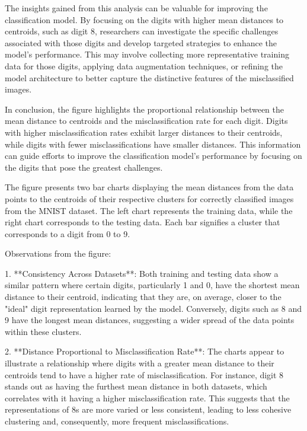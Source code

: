The insights gained from this analysis can be valuable for improving the classification model. By focusing on the digits with higher mean distances to centroids, such as digit 8, researchers can investigate the specific challenges associated with those digits and develop targeted strategies to enhance the model's performance. This may involve collecting more representative training data for those digits, applying data augmentation techniques, or refining the model architecture to better capture the distinctive features of the misclassified images.

In conclusion, the figure highlights the proportional relationship between the mean distance to centroids and the misclassification rate for each digit. Digits with higher misclassification rates exhibit larger distances to their centroids, while digits with fewer misclassifications have smaller distances. This information can guide efforts to improve the classification model's performance by focusing on the digits that pose the greatest challenges.


The figure presents two bar charts displaying the mean distances from the data points to the centroids of their respective clusters for correctly classified images from the MNIST dataset. The left chart represents the training data, while the right chart corresponds to the testing data. Each bar signifies a cluster that corresponds to a digit from 0 to 9.

Observations from the figure:

1. **Consistency Across Datasets**: Both training and testing data show a similar pattern where certain digits, particularly 1 and 0, have the shortest mean distance to their centroid, indicating that they are, on average, closer to the "ideal" digit representation learned by the model. Conversely, digits such as 8 and 9 have the longest mean distances, suggesting a wider spread of the data points within these clusters.

2. **Distance Proportional to Misclassification Rate**: The charts appear to illustrate a relationship where digits with a greater mean distance to their centroids tend to have a higher rate of misclassification. For instance, digit 8 stands out as having the furthest mean distance in both datasets, which correlates with it having a higher misclassification rate. This suggests that the representations of 8s are more varied or less consistent, leading to less cohesive clustering and, consequently, more frequent misclassifications.

